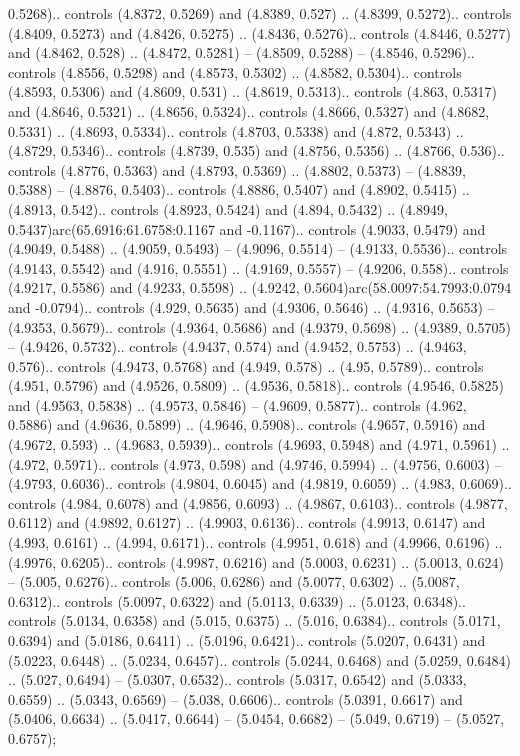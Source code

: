 0.5268).. controls (4.8372, 0.5269) and (4.8389, 0.527) .. (4.8399, 0.5272).. controls (4.8409, 0.5273) and (4.8426, 0.5275) .. (4.8436, 0.5276).. controls (4.8446, 0.5277) and (4.8462, 0.528) .. (4.8472, 0.5281) -- (4.8509, 0.5288) -- (4.8546, 0.5296).. controls (4.8556, 0.5298) and (4.8573, 0.5302) .. (4.8582, 0.5304).. controls (4.8593, 0.5306) and (4.8609, 0.531) .. (4.8619, 0.5313).. controls (4.863, 0.5317) and (4.8646, 0.5321) .. (4.8656, 0.5324).. controls (4.8666, 0.5327) and (4.8682, 0.5331) .. (4.8693, 0.5334).. controls (4.8703, 0.5338) and (4.872, 0.5343) .. (4.8729, 0.5346).. controls (4.8739, 0.535) and (4.8756, 0.5356) .. (4.8766, 0.536).. controls (4.8776, 0.5363) and (4.8793, 0.5369) .. (4.8802, 0.5373) -- (4.8839, 0.5388) -- (4.8876, 0.5403).. controls (4.8886, 0.5407) and (4.8902, 0.5415) .. (4.8913, 0.542).. controls (4.8923, 0.5424) and (4.894, 0.5432) .. (4.8949, 0.5437)arc(65.6916:61.6758:0.1167 and -0.1167).. controls (4.9033, 0.5479) and (4.9049, 0.5488) .. (4.9059, 0.5493) -- (4.9096, 0.5514) -- (4.9133, 0.5536).. controls (4.9143, 0.5542) and (4.916, 0.5551) .. (4.9169, 0.5557) -- (4.9206, 0.558).. controls (4.9217, 0.5586) and (4.9233, 0.5598) .. (4.9242, 0.5604)arc(58.0097:54.7993:0.0794 and -0.0794).. controls (4.929, 0.5635) and (4.9306, 0.5646) .. (4.9316, 0.5653) -- (4.9353, 0.5679).. controls (4.9364, 0.5686) and (4.9379, 0.5698) .. (4.9389, 0.5705) -- (4.9426, 0.5732).. controls (4.9437, 0.574) and (4.9452, 0.5753) .. (4.9463, 0.576).. controls (4.9473, 0.5768) and (4.949, 0.578) .. (4.95, 0.5789).. controls (4.951, 0.5796) and (4.9526, 0.5809) .. (4.9536, 0.5818).. controls (4.9546, 0.5825) and (4.9563, 0.5838) .. (4.9573, 0.5846) -- (4.9609, 0.5877).. controls (4.962, 0.5886) and (4.9636, 0.5899) .. (4.9646, 0.5908).. controls (4.9657, 0.5916) and (4.9672, 0.593) .. (4.9683, 0.5939).. controls (4.9693, 0.5948) and (4.971, 0.5961) .. (4.972, 0.5971).. controls (4.973, 0.598) and (4.9746, 0.5994) .. (4.9756, 0.6003) -- (4.9793, 0.6036).. controls (4.9804, 0.6045) and (4.9819, 0.6059) .. (4.983, 0.6069).. controls (4.984, 0.6078) and (4.9856, 0.6093) .. (4.9867, 0.6103).. controls (4.9877, 0.6112) and (4.9892, 0.6127) .. (4.9903, 0.6136).. controls (4.9913, 0.6147) and (4.993, 0.6161) .. (4.994, 0.6171).. controls (4.9951, 0.618) and (4.9966, 0.6196) .. (4.9976, 0.6205).. controls (4.9987, 0.6216) and (5.0003, 0.6231) .. (5.0013, 0.624) -- (5.005, 0.6276).. controls (5.006, 0.6286) and (5.0077, 0.6302) .. (5.0087, 0.6312).. controls (5.0097, 0.6322) and (5.0113, 0.6339) .. (5.0123, 0.6348).. controls (5.0134, 0.6358) and (5.015, 0.6375) .. (5.016, 0.6384).. controls (5.0171, 0.6394) and (5.0186, 0.6411) .. (5.0196, 0.6421).. controls (5.0207, 0.6431) and (5.0223, 0.6448) .. (5.0234, 0.6457).. controls (5.0244, 0.6468) and (5.0259, 0.6484) .. (5.027, 0.6494) -- (5.0307, 0.6532).. controls (5.0317, 0.6542) and (5.0333, 0.6559) .. (5.0343, 0.6569) -- (5.038, 0.6606).. controls (5.0391, 0.6617) and (5.0406, 0.6634) .. (5.0417, 0.6644) -- (5.0454, 0.6682) -- (5.049, 0.6719) -- (5.0527, 0.6757);



